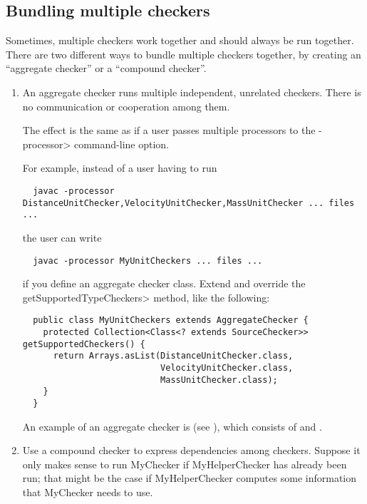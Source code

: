 \subsection{Bundling multiple checkers\label{bundling-multiple-checkers}}

Sometimes, multiple checkers work together and should always be run
together.  There are two different ways to bundle multiple checkers
together, by creating an ``aggregate checker'' or a ``compound checker''.


\begin{enumerate}
\item
An aggregate checker runs multiple independent, unrelated checkers.  There
is no communication or cooperation among them.

The effect is the same as if a user passes
multiple processors to the \<-processor> command-line option.

For example, instead of a user having to run

\begin{Verbatim}
  javac -processor DistanceUnitChecker,VelocityUnitChecker,MassUnitChecker ... files ...
\end{Verbatim}

\noindent
the user can write

\begin{Verbatim}
  javac -processor MyUnitCheckers ... files ...
\end{Verbatim}

\noindent
if you define an aggregate checker class.  Extend  and override
the \<getSupportedTypeCheckers> method, like the following:

\begin{Verbatim}
  public class MyUnitCheckers extends AggregateChecker {
    protected Collection<Class<? extends SourceChecker>> getSupportedCheckers() {
      return Arrays.asList(DistanceUnitChecker.class,
                           VelocityUnitChecker.class,
                           MassUnitChecker.class);
    }
  }
\end{Verbatim}

An example of an aggregate checker is 
(see ), which consists of
 and
.

\item
Use a compound checker to express dependencies among checkers.  Suppose it
only makes sense to run MyChecker if MyHelperChecker has already been run;
that might be the case if MyHelperChecker computes some information that
MyChecker needs to use.


\end{enumerate}
